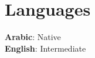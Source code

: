 \section{Languages}
    \begin{itemize}[leftmargin=0.0in, label={}]
	\footnotesize{\item{
		\textbf{Arabic}{: Native} \\
        \textbf{English}{: Intermediate} 
	}}
    \end{itemize}\vspace{-6pt}